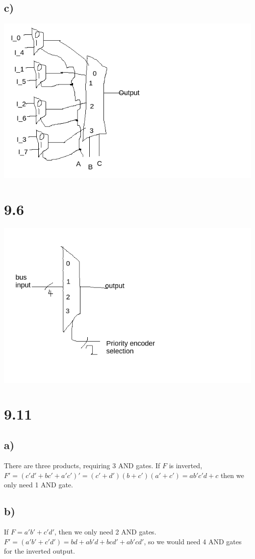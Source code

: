 \documentclass{article}
\begin{document}
\subsection{c)}
\includegraphics[scale=0.4]{222248}

\section{9.6}
\includegraphics[scale=0.4]{bus}

\section{9.11}
\subsection{a)}
There are three products, requiring 3 AND gates. If $F$ is
inverted, $F' = (c'd' + bc' + a'c')' = (c' + d')(b + c')(a' + c') = ab'c'd + c$ then we only need 1 AND gate.
\subsection{b)}
If $F = a'b' + c'd'$, then we only need 2 AND gates. $F' = (a'b' + c'd') = bd + ab'd + bcd' + ab'cd'$, so we would need 4 AND gates for the inverted output.
\end{document}
